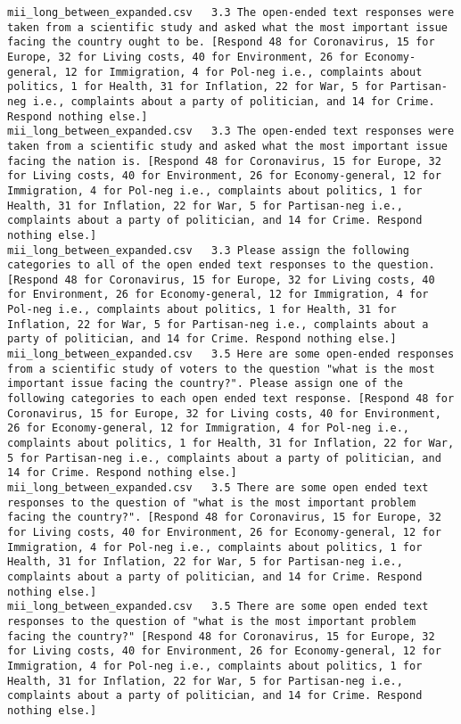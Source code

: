 \begin{lstlisting}[label=lst:promptvariants]
mii_long_between_expanded.csv	3.3	The open-ended text responses were taken from a scientific study and asked what the most important issue facing the country ought to be. [Respond 48 for Coronavirus, 15 for Europe, 32 for Living costs, 40 for Environment, 26 for Economy-general, 12 for Immigration, 4 for Pol-neg i.e., complaints about politics, 1 for Health, 31 for Inflation, 22 for War, 5 for Partisan-neg i.e., complaints about a party of politician, and 14 for Crime. Respond nothing else.]
mii_long_between_expanded.csv	3.3	The open-ended text responses were taken from a scientific study and asked what the most important issue facing the nation is. [Respond 48 for Coronavirus, 15 for Europe, 32 for Living costs, 40 for Environment, 26 for Economy-general, 12 for Immigration, 4 for Pol-neg i.e., complaints about politics, 1 for Health, 31 for Inflation, 22 for War, 5 for Partisan-neg i.e., complaints about a party of politician, and 14 for Crime. Respond nothing else.]
mii_long_between_expanded.csv	3.3	Please assign the following categories to all of the open ended text responses to the question. [Respond 48 for Coronavirus, 15 for Europe, 32 for Living costs, 40 for Environment, 26 for Economy-general, 12 for Immigration, 4 for Pol-neg i.e., complaints about politics, 1 for Health, 31 for Inflation, 22 for War, 5 for Partisan-neg i.e., complaints about a party of politician, and 14 for Crime. Respond nothing else.]
mii_long_between_expanded.csv	3.5	Here are some open-ended responses from a scientific study of voters to the question "what is the most important issue facing the country?". Please assign one of the following categories to each open ended text response. [Respond 48 for Coronavirus, 15 for Europe, 32 for Living costs, 40 for Environment, 26 for Economy-general, 12 for Immigration, 4 for Pol-neg i.e., complaints about politics, 1 for Health, 31 for Inflation, 22 for War, 5 for Partisan-neg i.e., complaints about a party of politician, and 14 for Crime. Respond nothing else.]
mii_long_between_expanded.csv	3.5	There are some open ended text responses to the question of "what is the most important problem facing the country?". [Respond 48 for Coronavirus, 15 for Europe, 32 for Living costs, 40 for Environment, 26 for Economy-general, 12 for Immigration, 4 for Pol-neg i.e., complaints about politics, 1 for Health, 31 for Inflation, 22 for War, 5 for Partisan-neg i.e., complaints about a party of politician, and 14 for Crime. Respond nothing else.]
mii_long_between_expanded.csv	3.5	There are some open ended text responses to the question of "what is the most important problem facing the country?" [Respond 48 for Coronavirus, 15 for Europe, 32 for Living costs, 40 for Environment, 26 for Economy-general, 12 for Immigration, 4 for Pol-neg i.e., complaints about politics, 1 for Health, 31 for Inflation, 22 for War, 5 for Partisan-neg i.e., complaints about a party of politician, and 14 for Crime. Respond nothing else.]

\end{lstlisting}
